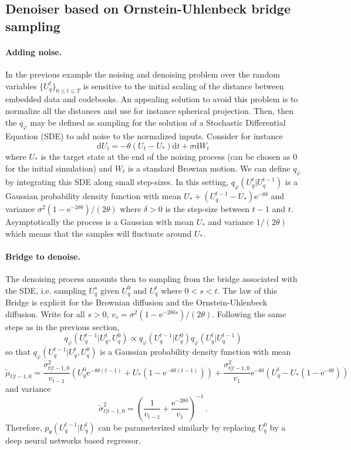 \documentclass{article}
\begin{document}
\subsection{Denoiser based on Ornstein-Uhlenbeck bridge sampling}
\paragraph{Adding noise. }
In the previous example the noising and denoising problem over the random variables $\{U_q^t\}_{0\leqslant t\leqslant T}$ is sensitive to the initial scaling of the distance between embedded data and codebooks. An appealing solution to avoid this problem is to normalize all the distances and use for instance spherical projection. Then, then the $q_\varphi$ may  be defined as sampling for the solution of a Stochastic Differential Equation (SDE) to add noise to the  normalized inputs. Consider for instance
$$
\mathrm{d}U_t = -\theta (U_t - U_*)\mathrm{d}t + \sigma\mathrm{d}W_t
$$
where $U_*$ is the target state at the end of the noising process (can be chosen as 0 for the initial simulation) and $W_t$ is a standard Browian motion. We can define $q_\varphi$ by integrating this SDE along small step-sizes. In this setting, $q_\varphi(U_q^{t}|U_q^{t-1})$ is a Gaussian probability density function with mean $U_* + (U_q^{t-1}-U_*)\mathrm{e}^{-\theta \delta}$ and variance $\sigma^2(1-\mathrm{e}^{-2\theta\delta})/(2\theta)$ where $\delta>0$ is the step-size between $t-1$ and $t$. Asymptotically the process is a Gaussian with mean $U_*$ and variance $1/(2\theta)$ which means that the samples will fluctuate around $U_*$.

\paragraph{Bridge to denoise. }
The denoising process amounts then to sampling from the bridge associated with the SDE, i.e. sampling $U_q^s$ given $U_q^0$ and $U_q^t$ where $0<s<t$. The law of this Bridge is explicit for the Brownian diffusion and the Ornstein-Uhlenbeck diffusion. Write for all $s>0$, $v_s = \sigma^2(1-\mathrm{e}^{-2\theta\delta s})/(2\theta)$.
Following the same steps as in the previous section,
$$
q_\varphi(U_q^{t-1}|U_q^{t},U_q^{0}) \propto q_\varphi(U_q^{t-1}|U_q^{0}) q_\varphi(U_q^{t}|U_q^{t-1})
$$
so that $q_\varphi(U_q^{t-1}|U_q^{t},U_q^{0})$ is a Gaussian probability density function with mean
$$
\tilde \mu_{t|t-1,0} = \frac{\sigma^2_{t|t-1,0}}{v_{t-1}}\left(U_q^0\mathrm{e}^{-\theta\delta(t-1)} +U_*(1-\mathrm{e}^{-\theta\delta(t-1)})\right) + \frac{\sigma^2_{t|t-1,0}}{v_{1}}\mathrm{e}^{-\theta\delta}\left(U_q^t - U_*(1 - \mathrm{e}^{-\theta\delta} )\right)
$$
and variance
$$
\tilde \sigma^2_{t|t-1,0} = \left(\frac{1}{v_{t-1}} + \frac{\mathrm{e}^{-2\theta\delta}}{v_1}\right)^{-1}\,.
$$
 Therefore, $p_\theta(U_q^{t-1}|U_q^t)$ can be parameterized similarly by replacing $U_q^0$ by a deep neural networks based regressor.
\end{document}
